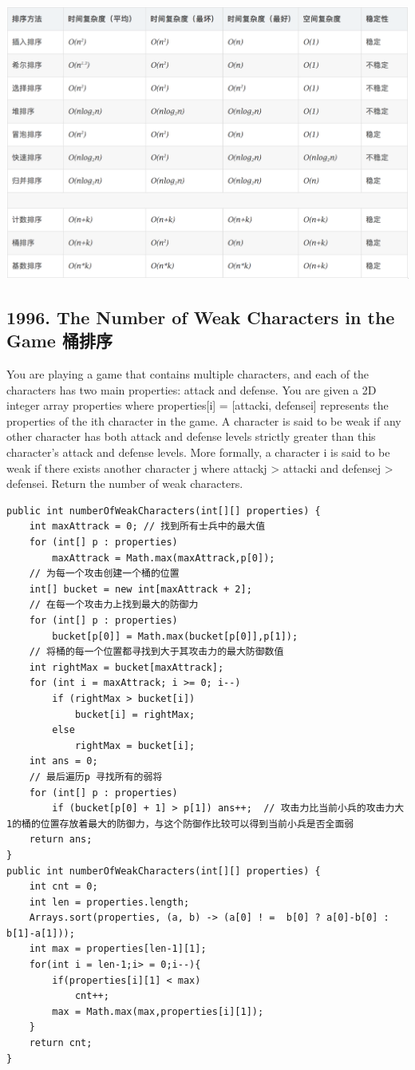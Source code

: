 \documentclass[9pt, b5paper]{article}
\begin{document}
\includegraphics[width=.9\linewidth]{./pic/sort2.png}

\subsection{1996. The Number of Weak Characters in the Game 桶排序}
\label{sec-7-1}
You are playing a game that contains multiple characters, and each of the characters has two main properties: attack and defense. You are given a 2D integer array properties where properties[i] = [attacki, defensei] represents the properties of the ith character in the game.
A character is said to be weak if any other character has both attack and defense levels strictly greater than this character's attack and defense levels. More formally, a character i is said to be weak if there exists another character j where attackj > attacki and defensej > defensei.
Return the number of weak characters.
\begin{verbatim}
public int numberOfWeakCharacters(int[][] properties) {
    int maxAttrack = 0; // 找到所有士兵中的最大值
    for (int[] p : properties)
        maxAttrack = Math.max(maxAttrack,p[0]);
    // 为每一个攻击创建一个桶的位置
    int[] bucket = new int[maxAttrack + 2];     
    // 在每一个攻击力上找到最大的防御力
    for (int[] p : properties)
        bucket[p[0]] = Math.max(bucket[p[0]],p[1]);
    // 将桶的每一个位置都寻找到大于其攻击力的最大防御数值
    int rightMax = bucket[maxAttrack];
    for (int i = maxAttrack; i >= 0; i--) 
        if (rightMax > bucket[i])
            bucket[i] = rightMax;
        else
            rightMax = bucket[i];
    int ans = 0;
    // 最后遍历p 寻找所有的弱将
    for (int[] p : properties)
        if (bucket[p[0] + 1] > p[1]) ans++;  // 攻击力比当前小兵的攻击力大1的桶的位置存放着最大的防御力，与这个防御作比较可以得到当前小兵是否全面弱
    return ans;
}
public int numberOfWeakCharacters(int[][] properties) {
    int cnt = 0;
    int len = properties.length;
    Arrays.sort(properties, (a, b) -> (a[0] ! =  b[0] ? a[0]-b[0] : b[1]-a[1]));
    int max = properties[len-1][1];
    for(int i = len-1;i> = 0;i--){
        if(properties[i][1] < max)
            cnt++;
        max = Math.max(max,properties[i][1]);
    }
    return cnt;
}
\end{verbatim}
\end{document}
